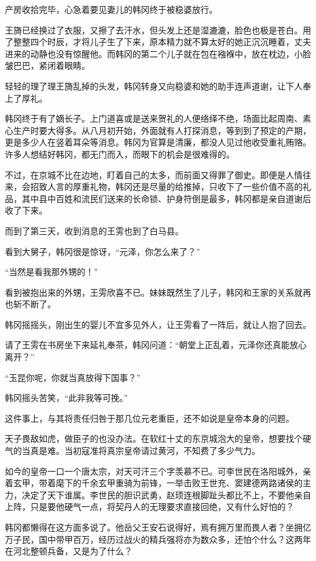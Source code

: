 产房收拾完毕，心急着要见妻儿的韩冈终于被稳婆放行。

王旖已经换过了衣服，又擦了去汗水，但头发上还是湿漉漉，脸色也极是苍白。用了整整四个时辰，才将儿子生了下来，原本精力就不算太好的她正沉沉睡着，丈夫进来的动静也没有惊醒他。而韩冈的第二个儿子就在包在襁褓中，放在枕边，小脸皱巴巴，紧闭着眼睛。

轻轻的理了理王旖乱掉的头发，韩冈转身又向稳婆和她的助手连声道谢，让下人奉上了厚礼。

韩冈终于有了嫡长子。上门道喜或是送来贺礼的人便络绎不绝，场面比起周南、素心生产时要大得多。从八月初开始，外面就有人打探消息，等到到了预定的产期，更是多少人在竖着耳朵等消息。韩冈为官算是清廉，都没人见过他收受重礼贿赂。许多人想结好韩冈，都无门而入，而眼下的机会是很难得的。

不过，在京城不比在边地，盯着自己的太多，而前面又得罪了御史。即便是人情往来，会招致人言的厚重礼物，韩冈还是尽量的给推掉，只收下了一些价值不高的礼品，其中县中百姓和流民们送来的长命锁、护身符倒是最多，韩冈都是亲自道谢后收了下来。

而到了第三天，收到消息的王雱也到了白马县。

看到大舅子，韩冈很是惊讶，“元泽，你怎么来了？”

“当然是看我那外甥的！”

看到被抱出来的外甥，王雱欣喜不已。妹妹既然生了儿子，韩冈和王家的关系就再也斩不断了。

韩冈摇摇头，刚出生的婴儿不宜多见外人，让王雱看了一阵后，就让人抱了回去。

请了王雱在书房坐下来延礼奉茶，韩冈问道：“朝堂上正乱着，元泽你还真能放心离开？”

“玉昆你呢，你就当真放得下国事？”

韩冈摇头苦笑，“此非我等可挽。”

这件事上，与其将责任归咎于那几位元老重臣，还不如说是皇帝本身的问题。

天子畏敌如虎，做臣子的也没办法。在软红十丈的东京城泡大的皇帝，想要找个硬气的当真是难。当初寇准将真宗皇帝请过黄河，不知费了多少气力。

如今的皇帝一口一个唐太宗，对天可汗三个字羡慕不已。可李世民在洛阳城外，亲着玄甲，带着麾下的千余玄甲重骑为前锋，一举击败王世充、窦建德两路诸侯的主力，决定了天下谁属。李世民的胆识武勇，赵顼连根脚趾头都比不上，不要他亲自上阵，只是要他硬气一点，将契丹人的无理要求直接回绝，又有什么好怕的？

韩冈都懒得在这方面多说了。他岳父王安石说得好，焉有拥万里而畏人者？坐拥亿万子民，国中带甲百万，经历过战火的精兵强将亦为数众多，还怕个什么？这两年在河北整顿兵备，又是为了什么？

